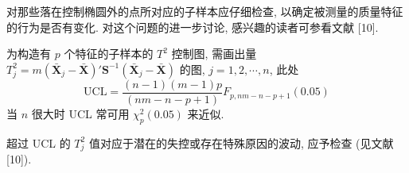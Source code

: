对那些落在控制椭圆外的点所对应的子样本应仔细检查, 以确定被测量的质量特征的行为是否有变化. 对这个问题的进一步讨论, 感兴趣的读者可参看文献 [10].

\medskip
\noindent{}\quad 为构造有 $p$ 个特征的子样本的 $T^{2}$ 控制图, 需画出量 $T_{j}^{2}=m(\bar{\mathbf{X}}_{j}-\bar{\mathbf{X}})'\mathbf{S}^{-1}(\bar{\mathbf{X}}_{j}-\bar{\mathbf{X}})$ 的图, $j=1,2,\cdots,n$, 此处
\[
\text{UCL}=\frac{(n-1)(m-1)p}{(nm-n-p+1)}F_{p,nm-n-p+1}(0.05)
\]
当 $n$ 很大时 UCL 常可用 $\chi_{p}^{2}(0.05)$ 来近似.

超过 UCL 的 $T_{j}^{2}$ 值对应于潜在的失控或存在特殊原因的波动, 应予检查 (见文献 [10]).
